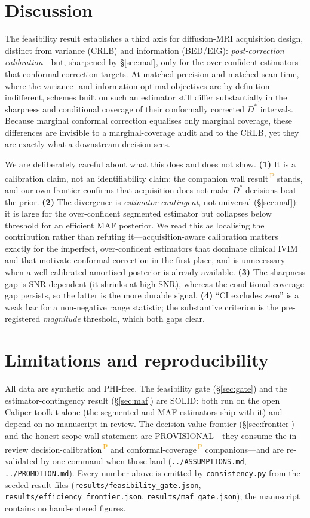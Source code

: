 \documentclass[11pt]{article}
\newcommand{\PROV}{\textsuperscript{\textcolor{orange}{\,P}}}
\newcommand{\Dstar}{D^{*}}
\begin{document}
\section{Discussion}

The feasibility result establishes a third axis for diffusion-MRI acquisition design,
distinct from variance (CRLB) and information (BED/EIG): \emph{post-correction
calibration}---but, sharpened by \S\ref{sec:maf}, only for the over-confident estimators
that conformal correction targets. At matched precision and matched scan-time, where the
variance- and information-optimal objectives are by definition indifferent, schemes built
on such an estimator still differ substantially in the sharpness and conditional coverage
of their conformally corrected $\Dstar$ intervals. Because marginal conformal correction
equalises only marginal coverage, these differences are invisible to a marginal-coverage
audit and to the CRLB, yet they are exactly what a downstream decision sees.

We are deliberately careful about what this does and does not show. \textbf{(1)} It is
a calibration claim, not an identifiability claim: the companion wall result\PROV{}
stands, and our own frontier confirms that acquisition does not make $\Dstar$ decisions
beat the prior. \textbf{(2)} The divergence is \emph{estimator-contingent}, not universal
(\S\ref{sec:maf}): it is large for the over-confident segmented estimator but collapses
below threshold for an efficient MAF posterior. We read this as localising the
contribution rather than refuting it---acquisition-aware calibration matters exactly for
the imperfect, over-confident estimators that dominate clinical IVIM and that motivate
conformal correction in the first place, and is unnecessary when a well-calibrated
amortised posterior is already available. \textbf{(3)} The sharpness gap is
SNR-dependent (it shrinks at high SNR), whereas the conditional-coverage gap persists,
so the latter is the more durable signal. \textbf{(4)} ``CI excludes zero'' is a weak
bar for a non-negative range statistic; the substantive criterion is the pre-registered
\emph{magnitude} threshold, which both gaps clear.

\section{Limitations and reproducibility}

All data are synthetic and PHI-free. The feasibility gate (\S\ref{sec:gate}) and the
estimator-contingency result (\S\ref{sec:maf}) are SOLID: both run on the open Caliper
toolkit alone (the segmented and MAF estimators ship with it) and depend on no manuscript
in review. The
decision-value frontier (\S\ref{sec:frontier}) and the honest-scope wall statement are
PROVISIONAL---they consume the in-review decision-calibration\PROV{} and conformal-coverage\PROV{}
companions---and are re-validated by one command when those land
(\texttt{../ASSUMPTIONS.md}, \texttt{../PROMOTION.md}). Every number above is emitted by
\texttt{consistency.py} from the seeded result files
(\texttt{results/feasibility\_gate.json}, \texttt{results/efficiency\_frontier.json},
\texttt{results/maf\_gate.json}); the manuscript contains no hand-entered figures.
\end{document}

